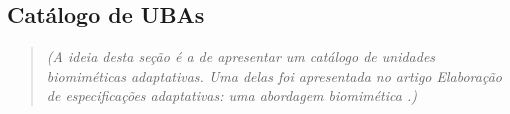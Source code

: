 
\subsection{Catálogo de UBAs}
\label{sec:catalogo}

\begin{quote}
\textit{(A ideia desta seção é a de apresentar um catálogo de unidades biomiméticas adaptativas. Uma delas foi apresentada no artigo \textit{Elaboração de especificações adaptativas: uma abordagem biomimética} \cite{vega:2015}.)}
\end{quote}

